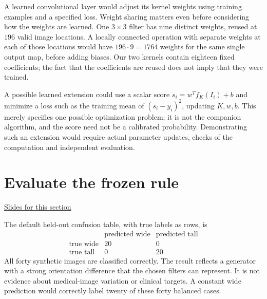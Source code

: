 \documentclass[11pt,letterpaper]{article}
\theoremstyle{definition}\newtheorem{definition}{Definition}\newtheorem{example}{Example}
\numberwithin{equation}{section}
\begin{document}
A learned convolutional layer would adjust its kernel weights using training examples and a specified loss. Weight sharing matters even before considering how the weights are learned. One $3\times3$ filter has nine distinct weights, reused at $196$ valid image locations. A locally connected operation with separate weights at each of those locations would have $196\cdot9=1764$ weights for the same single output map, before adding biases. Our two kernels contain eighteen fixed coefficients; the fact that the coefficients are reused does not imply that they were trained.

A possible learned extension could use a scalar score $s_i=w^Tf_K(I_i)+b$ and minimize a loss such as the training mean of $(s_i-y_i)^2$, updating $K,w,b$. This merely specifies one possible optimization problem; it is not the companion algorithm, and the score need not be a calibrated probability. Demonstrating such an extension would require actual parameter updates, checks of the computation and independent evaluation.
\section{Evaluate the frozen rule}
\hypertarget{note-evaluate-the-frozen-rule}{}\label{note:evaluate-the-frozen-rule}
{\small \href{slides.html\#frame=the-held-out-image-counts-figure\&step=1}{Slides for this section}}\par
The default held-out confusion table, with true labels as rows, is
\[
\begin{array}{c|rr}
&\text{predicted wide}&\text{predicted tall}\\\hline
\text{true wide}&20&0\\
\text{true tall}&0&20
\end{array}
\]
All forty synthetic images are classified correctly. The result reflects a generator with a strong orientation difference that the chosen filters can represent. It is not evidence about medical-image variation or clinical targets. A constant wide prediction would correctly label twenty of these forty balanced cases.
\end{document}
